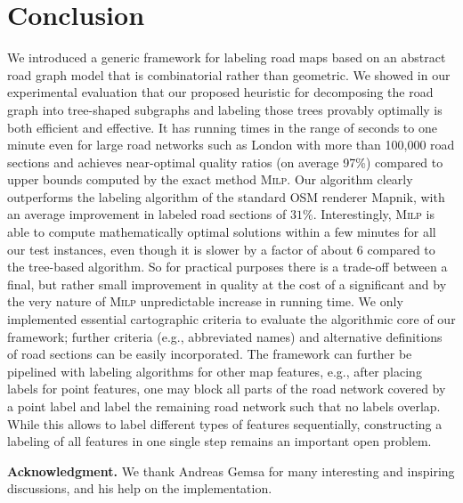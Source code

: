 \documentclass[a4paper,11pt]{article}
\newcommand{\ILPAlgo}{\textsc{Milp}\xspace}
\begin{document}
\section{Conclusion}
We introduced a generic framework for labeling road maps based on an
abstract road graph model that is combinatorial rather than geometric.
We showed in our experimental evaluation that our proposed heuristic
for decomposing the road graph into tree-shaped subgraphs and labeling
those trees provably optimally is both efficient and effective.  It
has running times in the range of seconds to one minute even for large
road networks such as London with more than 100,000 road sections and
achieves near-optimal quality ratios (on average 97\%) compared to
upper bounds computed by the exact method \ILPAlgo.  Our algorithm
clearly outperforms the labeling algorithm of the standard OSM
renderer Mapnik, with an average improvement in labeled road sections
of $31\%$.  Interestingly, \ILPAlgo is able to compute mathematically
optimal solutions within a few minutes for all our test instances,
even though it is slower by a factor of about 6 compared to the
tree-based algorithm. So for practical purposes there is a trade-off
between a final, but rather small improvement in quality at the cost
of a significant and by the very nature of \ILPAlgo unpredictable
increase in running time. We only implemented essential cartographic
criteria to evaluate the algorithmic core of our framework; further
criteria (e.g., abbreviated names) and alternative definitions of road sections can be easily incorporated.
The framework can further be pipelined with labeling
  algorithms for other map features, e.g., after placing labels for point features,
  one may block all parts of the road network covered by a point label and label the remaining road
  network such that no labels overlap. While this allows to label
  different types of features sequentially, constructing a labeling of
  all features in one single step remains an important open problem.



\medskip
\noindent\textbf{Acknowledgment.} We thank Andreas Gemsa for many interesting
and inspiring discussions, and his help on the implementation.
\end{document}
